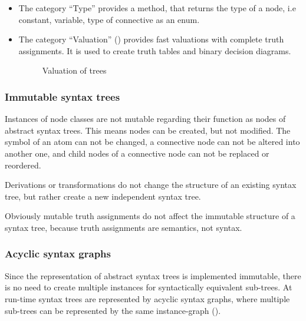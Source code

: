 \begin{itemize}
\item The  category “Type” provides a method, 
that returns the type of a node, i.e constant, variable, type of connective as an enum.


\item The category “Valuation” () 
provides fast valuations with complete truth assignments. 
It is used to create truth tables and binary decision diagrams. 

\begin{figure}[htbp]
\begin{center}
\caption{Valuation of trees}
\label{fig:NyayaNodeValuation}
\end{center}
\end{figure}

\end{itemize}
\subsubsection{Immutable syntax trees}

Instances of node classes are not mutable 
regarding their function as nodes of abstract syntax trees. 
This means nodes can be created, but not modified.
The symbol of an atom can not be changed, 
a connective node can not be altered into another one,
and child nodes of a connective node can not be replaced or reordered.

Derivations or transformations do not change the structure of an existing syntax tree,
but rather create a new independent syntax tree.

Obviously mutable truth assignments do not affect the immutable structure of a syntax tree,
because truth assignments are semantics, not syntax. 

\subsubsection{Acyclic syntax graphs}

Since the representation of abstract syntax trees is implemented immutable,
there is no need to create multiple instances for syntactically equivalent sub-trees. 
At run-time syntax trees are represented by acyclic syntax graphs, 
where multiple sub-trees can be represented by the same instance-graph
().


